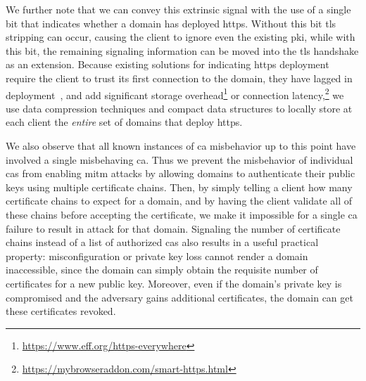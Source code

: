 We further note that we can convey this extrinsic signal with the use of a
single bit that indicates whether a domain has deployed \ac{https}. Without this
bit \ac{tls} stripping can occur, causing the client to ignore even the existing
\ac{pki}, while with this bit, the remaining signaling information can be moved
into the \ac{tls} handshake as an extension. Because existing solutions for
indicating \ac{https} deployment require the client to trust its first
connection to the domain, they have lagged in deployment~\cite{rfc4033,
rfc6698}, and add significant storage
overhead\footnote{\url{https://www.eff.org/https-everywhere}} or connection
latency,\footnote{\url{https://mybrowseraddon.com/smart-https.html}} we use
data compression techniques and compact data structures to locally store at each
client the \emph{entire} set of domains that deploy \ac{https}.

We also observe that all known instances of \ac{ca} misbehavior up to this point
have involved a single misbehaving \ac{ca}. Thus we prevent the misbehavior of
individual \acp{ca} from enabling \ac{mitm} attacks by allowing domains to
authenticate their public keys using multiple certificate chains. Then, by
simply telling a client how many certificate chains to expect for a domain, and
by having the client validate all of these chains before accepting the
certificate, we make it impossible for a single \ac{ca} failure to result in
 attack for that domain. Signaling the number of certificate chains
instead of a list of authorized \acp{ca} also results in a useful practical
property: misconfiguration or private key loss cannot render a domain
inaccessible, since the domain can simply obtain the requisite number of
certificates for a new public key. Moreover, even if the domain's private key is
compromised and the adversary gains additional certificates, the domain can get
these certificates revoked.



